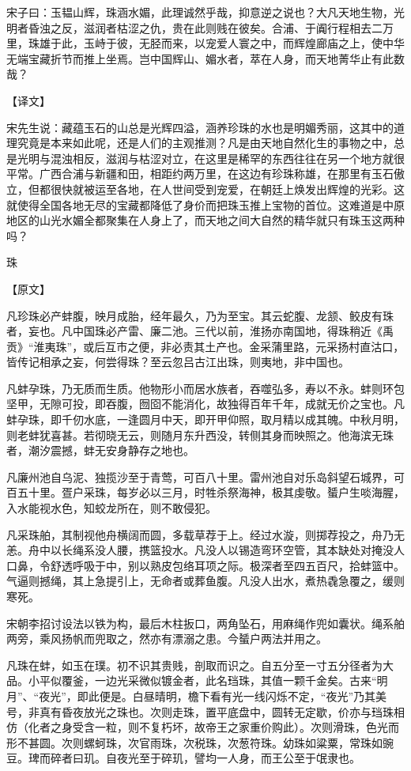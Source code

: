 \documentclass[12pt,UTF8]{ctexbook}
\begin{document}
宋子曰：玉韫山辉，珠涵水媚，此理诚然乎哉，抑意逆之说也？大凡天地生物，光明者昏浊之反，滋润者枯涩之仇，贵在此则贱在彼矣。合浦、于阗行程相去二万里，珠雄于此，玉峙于彼，无胫而来，以宠爱人寰之中，而辉煌廊庙之上，使中华无端宝藏折节而推上坐焉。岂中国辉山、媚水者，萃在人身，而天地菁华止有此数哉？

【译文】

宋先生说：藏蕴玉石的山总是光辉四溢，涵养珍珠的水也是明媚秀丽，这其中的道理究竟是本来如此呢，还是人们的主观推测？凡是由天地自然化生的事物之中，总是光明与混浊相反，滋润与枯涩对立，在这里是稀罕的东西往往在另一个地方就很平常。广西合浦与新疆和田，相距约两万里，在这边有珍珠称雄，在那里有玉石傲立，但都很快就被运至各地，在人世间受到宠爱，在朝廷上焕发出辉煌的光彩。这就使得全国各地无尽的宝藏都降低了身价而把珠玉推上宝物的首位。这难道是中原地区的山光水媚全都聚集在人身上了，而天地之间大自然的精华就只有珠玉这两种吗？

珠

【原文】

凡珍珠必产蚌腹，映月成胎，经年最久，乃为至宝。其云蛇腹、龙颔、鲛皮有珠者，妄也。凡中国珠必产雷、廉二池。三代以前，淮扬亦南国地，得珠稍近《禹贡》“淮夷珠”，或后互市之便，非必责其土产也。金采蒲里路，元采扬村直沽口，皆传记相承之妄，何尝得珠？至云忽吕古江出珠，则夷地，非中国也。

凡蚌孕珠，乃无质而生质。他物形小而居水族者，吞噬弘多，寿以不永。蚌则环包坚甲，无隙可投，即吞腹，囫囵不能消化，故独得百年千年，成就无价之宝也。凡蚌孕珠，即千仞水底，一逢圆月中天，即开甲仰照，取月精以成其魄。中秋月明，则老蚌犹喜甚。若彻晓无云，则随月东升西没，转侧其身而映照之。他海滨无珠者，潮汐震撼，蚌无安身静存之地也。

凡廉州池自乌泥、独揽沙至于青莺，可百八十里。雷州池自对乐岛斜望石城界，可百五十里。疍户采珠，每岁必以三月，时牲杀祭海神，极其虔敬。蜑户生啖海腥，入水能视水色，知蛟龙所在，则不敢侵犯。

凡采珠舶，其制视他舟横阔而圆，多载草荐于上。经过水漩，则掷荐投之，舟乃无恙。舟中以长绳系没人腰，携篮投水。凡没人以锡造弯环空管，其本缺处对掩没人口鼻，令舒透呼吸于中，别以熟皮包络耳项之际。极深者至四五百尺，拾蚌篮中。气逼则撼绳，其上急提引上，无命者或葬鱼腹。凡没人出水，煮热毳急覆之，缓则寒死。

宋朝李招讨设法以铁为构，最后木柱扳口，两角坠石，用麻绳作兜如囊状。绳系舶两旁，乘风扬帆而兜取之，然亦有漂溺之患。今蜑户两法并用之。

凡珠在蚌，如玉在璞。初不识其贵贱，剖取而识之。自五分至一寸五分径者为大品。小平似覆釜，一边光采微似镀金者，此名珰珠，其值一颗千金矣。古来“明月”、“夜光”，即此便是。白昼晴明，檐下看有光一线闪烁不定，“夜光”乃其美号，非真有昏夜放光之珠也。次则走珠，置平底盘中，圆转无定歇，价亦与珰珠相仿（化者之身受含一粒，则不复朽坏，故帝王之家重价购此）。次则滑珠，色光而形不甚圆。次则螺蚵珠，次官雨珠，次税珠，次葱符珠。幼珠如粱粟，常珠如豌豆。琕而碎者曰玑。自夜光至于碎玑，譬均一人身，而王公至于氓隶也。
\end{document}
